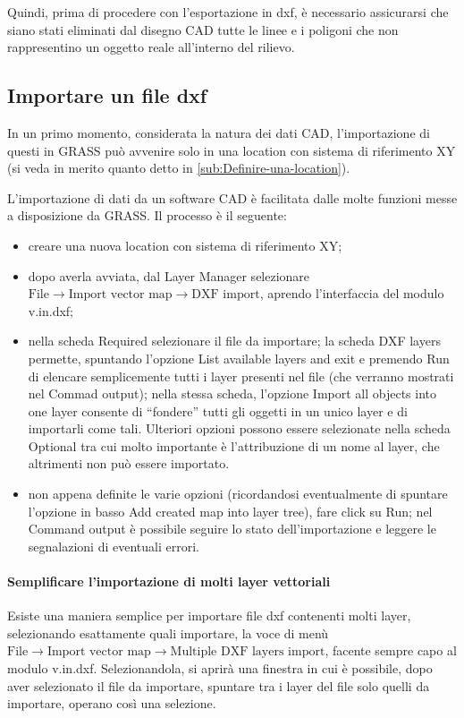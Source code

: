 		Quindi, prima di procedere con l'esportazione in dxf, è necessario assicurarsi che siano stati eliminati dal disegno CAD tutte le linee e i poligoni che non rappresentino un oggetto reale all'interno del rilievo.

	\subsection{Importare un file dxf\label{sub:Importare-un-file-dxf}}
		In un primo momento, considerata la natura dei dati CAD, l'importazione di questi in GRASS può avvenire solo in una location con sistema di riferimento XY (si veda in merito quanto detto in \textsection\ref{sub:Definire-una-location}).

		

		L'importazione di dati da un software CAD è facilitata dalle molte funzioni messe a disposizione da GRASS. Il processo è il seguente:
		
		\begin{itemize}
			\item creare una nuova location con sistema di riferimento XY;
			\item dopo averla avviata, dal Layer Manager selezionare \textsf{$\text{File}\rightarrow\text{Import vector map}\rightarrow\text{DXF import}$}, aprendo l'interfaccia del modulo \textsf{v.in.dxf};
			\item nella scheda \textsf{Required} selezionare il file da importare; la scheda \textsf{DXF layers} permette, spuntando l'opzione \textsf{List available layers and exit} e premendo \textsf{Run} di elencare semplicemente tutti i layer presenti nel file (che verranno mostrati nel \textsf{Commad output}); nella stessa scheda, l'opzione \textsf{Import all objects into one layer} consente di ``fondere'' tutti gli oggetti in un unico layer e di importarli come tali. Ulteriori opzioni possono essere selezionate nella scheda \textsf{Optional} tra cui molto importante è l'attribuzione di un nome al layer, che altrimenti non può essere importato.
			\item non appena definite le varie opzioni (ricordandosi eventualmente di spuntare l'opzione in basso \textsf{Add created map into layer tree}), fare click su \textsf{Run}; nel \textsf{Command output} è possibile seguire lo stato dell'importazione e leggere le segnalazioni di eventuali errori.
		\end{itemize}

			\paragraph{Semplificare l'importazione di molti layer vettoriali}
			Esiste una maniera semplice per importare file dxf contenenti molti layer, selezionando esattamente quali importare, la voce di menù \textsf{$\text{File}\rightarrow\text{Import vector map}\rightarrow\text{Multiple DXF layers import}$}, facente sempre capo al modulo \textsf{v.in.dxf}. Selezionandola, si aprirà una finestra in cui è possibile, dopo aver selezionato il file da importare, spuntare tra i layer del file solo quelli da importare, operano così una selezione.

